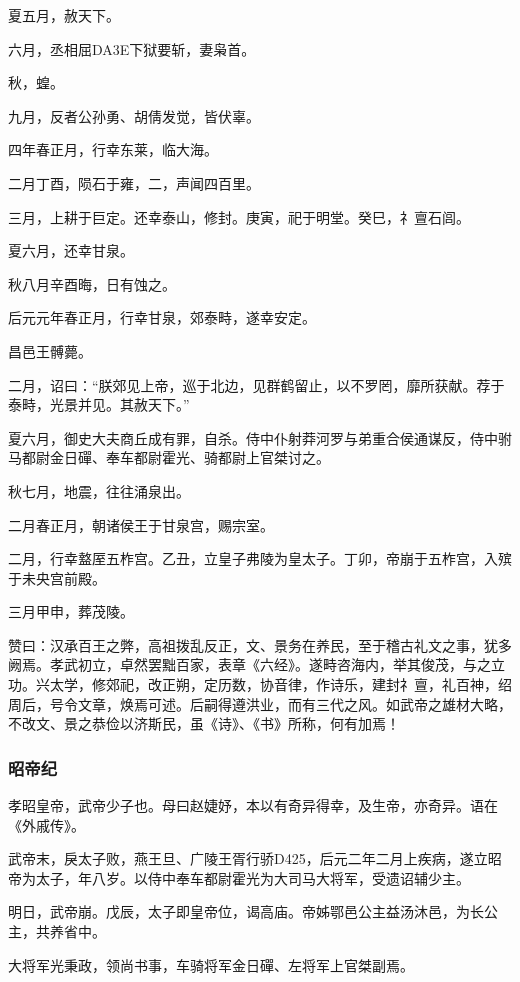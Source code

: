 \documentclass[]{article}
\begin{document}
夏五月，赦天下。

六月，丞相屈DA3E下狱要斩，妻枭首。

秋，蝗。

九月，反者公孙勇、胡倩发觉，皆伏辜。

四年春正月，行幸东莱，临大海。

二月丁酉，陨石于雍，二，声闻四百里。

三月，上耕于巨定。还幸泰山，修封。庚寅，祀于明堂。癸巳，礻亶石闾。

夏六月，还幸甘泉。

秋八月辛酉晦，日有蚀之。

后元元年春正月，行幸甘泉，郊泰畤，遂幸安定。

昌邑王髆薨。

二月，诏曰：``朕郊见上帝，巡于北边，见群鹤留止，以不罗罔，靡所获献。荐于泰畤，光景并见。其赦天下。''

夏六月，御史大夫商丘成有罪，自杀。侍中仆射莽河罗与弟重合侯通谋反，侍中驸马都尉金日磾、奉车都尉霍光、骑都尉上官桀讨之。

秋七月，地震，往往涌泉出。

二月春正月，朝诸侯王于甘泉宫，赐宗室。

二月，行幸盩厔五柞宫。乙丑，立皇子弗陵为皇太子。丁卯，帝崩于五柞宫，入殡于未央宫前殿。

三月甲申，葬茂陵。

赞曰：汉承百王之弊，高祖拨乱反正，文、景务在养民，至于稽古礼文之事，犹多阙焉。孝武初立，卓然罢黜百家，表章《六经》。遂畤咨海内，举其俊茂，与之立功。兴太学，修郊祀，改正朔，定历数，协音律，作诗乐，建封礻亶，礼百神，绍周后，号令文章，焕焉可述。后嗣得遵洪业，而有三代之风。如武帝之雄材大略，不改文、景之恭俭以济斯民，虽《诗》、《书》所称，何有加焉！

\hypertarget{header-n645}{%
\subsubsection{昭帝纪}\label{header-n645}}

孝昭皇帝，武帝少子也。母曰赵婕妤，本以有奇异得幸，及生帝，亦奇异。语在《外戚传》。

武帝末，戾太子败，燕王旦、广陵王胥行骄D425，后元二年二月上疾病，遂立昭帝为太子，年八岁。以侍中奉车都尉霍光为大司马大将军，受遗诏辅少主。

明日，武帝崩。戊辰，太子即皇帝位，谒高庙。帝姊鄂邑公主益汤沐邑，为长公主，共养省中。

大将军光秉政，领尚书事，车骑将军金日磾、左将军上官桀副焉。
\end{document}

